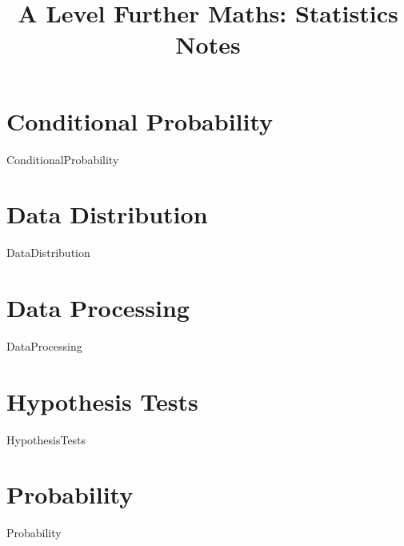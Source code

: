 \documentclass{report}
\title{A Level Further Maths: Statistics Notes}
\date{ }
\begin{document}
    \maketitle
    \tableofcontents
    \newpage

	\chapter{Conditional Probability}
	{ConditionalProbability}

	\chapter{Data Distribution}
	{DataDistribution}

	\chapter{Data Processing}
	{DataProcessing}

	\chapter{Hypothesis Tests}
	{HypothesisTests}

	\chapter{Probability}
	{Probability}
\end{document}
